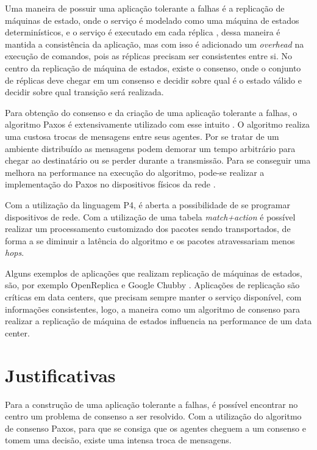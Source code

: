 \documentclass[12pt,
openright, 
oneside,
a4paper,
brazil]{facom-ufu-abntex2}
\begin{document}
Uma maneira de possuir uma aplicação tolerante a falhas é a replicação de máquinas
de estado, onde o serviço é modelado como uma máquina de estados determinísticos, e o
serviço é executado em cada réplica \citep{santos2012state}, dessa maneira é mantida
a consistência da aplicação, mas com isso é adicionado um \textit{overhead} na execução
de comandos, pois as réplicas precisam ser consistentes entre si. No centro da replicação
de máquina de estados, existe o consenso, onde o conjunto de réplicas deve chegar 
em um consenso e decidir sobre qual é o estado válido e decidir sobre qual 
transição será realizada. 

Para obtenção do consenso e da criação de uma aplicação tolerante a falhas, o algoritmo
Paxos é extensivamente utilizado com esse intuito \citep{dang2016paxos}. 
O algoritmo realiza uma custosa trocas de mensagens entre seus agentes. Por se 
tratar de um ambiente distribuído as mensagens podem demorar um tempo arbitrário 
para chegar ao destinatário ou se perder durante a transmissão. Para se 
conseguir uma melhora na performance na execução do algoritmo, pode-se realizar a 
implementação do Paxos no dispositivos físicos da rede \citep{dang2016paxos}.

Com a utilização da linguagem P4, é aberta a possibilidade de se programar dispositivos
de rede. Com a utilização de uma tabela \textit{match+action} é possível 
realizar um processamento customizado dos pacotes sendo transportados, de forma a
se diminuir a latência do algoritmo e os pacotes atravessariam menos \textit{hops}.

Alguns exemplos de aplicações que realizam replicação de máquinas de estados, são,
por exemplo OpenReplica \citep{openreplica} e Google Chubby \citep{27897}. Aplicações
de replicação são críticas em data centers, que precisam sempre manter o serviço 
disponível, com informações consistentes, logo, a maneira como um algoritmo de consenso
para realizar a replicação de máquina de estados influencia na performance de um data center.

\section{Justificativas}
Para a construção de uma aplicação tolerante a falhas, é possível encontrar no centro um
problema de consenso a ser resolvido. Com a utilização do algoritmo de consenso Paxos,
para  que se consiga que os agentes cheguem a um consenso e tomem uma decisão, 
existe uma intensa troca de mensagens.
\end{document}

